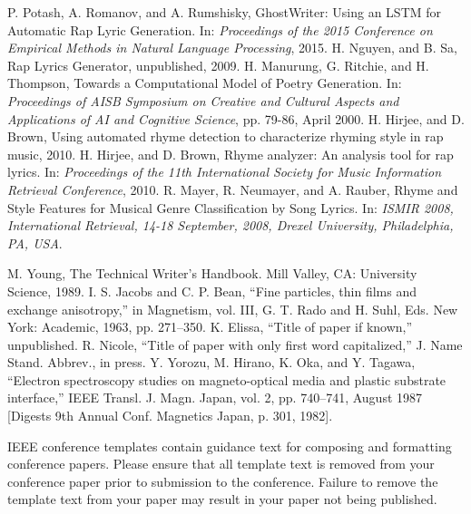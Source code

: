 \documentclass[conference]{IEEEtran}
\begin{document}
\begin{thebibliography}{00}
 P. Potash, A. Romanov, and A. Rumshisky, GhostWriter: Using an LSTM for Automatic Rap Lyric Generation. In: \emph{Proceedings of the 2015 Conference on Empirical Methods in Natural Language Processing}, 2015.
 H. Nguyen, and B. Sa, Rap Lyrics Generator, unpublished, 2009.
 H. Manurung, G. Ritchie, and H. Thompson, Towards a Computational Model of Poetry Generation. In: \emph{Proceedings of AISB Symposium on Creative and Cultural Aspects and Applications of AI and Cognitive Science}, pp. 79-86, April 2000.
 H. Hirjee, and D. Brown, Using automated rhyme detection to characterize rhyming style in rap music, 2010.
 H. Hirjee, and D. Brown, Rhyme analyzer: An analysis tool for rap lyrics. In: \emph{Proceedings of the 11th International Society for Music Information Retrieval Conference}, 2010.
 R. Mayer, R. Neumayer, and A. Rauber, Rhyme and Style Features for Musical Genre Classification by Song Lyrics. In: \emph{ISMIR 2008,  International Retrieval, 14-18 September, 2008, Drexel University, Philadelphia, PA, USA}.

 M. Young, The Technical Writer's Handbook. Mill Valley, CA: University Science, 1989.
 I. S. Jacobs and C. P. Bean, ``Fine particles, thin films and exchange anisotropy,'' in Magnetism, vol. III, G. T. Rado and H. Suhl, Eds. New York: Academic, 1963, pp. 271--350.
 K. Elissa, ``Title of paper if known,'' unpublished.
 R. Nicole, ``Title of paper with only first word capitalized,'' J. Name Stand. Abbrev., in press.
 Y. Yorozu, M. Hirano, K. Oka, and Y. Tagawa, ``Electron spectroscopy studies on magneto-optical media and plastic substrate interface,'' IEEE Transl. J. Magn. Japan, vol. 2, pp. 740--741, August 1987 [Digests 9th Annual Conf. Magnetics Japan, p. 301, 1982].

\end{thebibliography}
\vspace{12pt}
\color{red}
IEEE conference templates contain guidance text for composing and formatting conference papers. Please ensure that all template text is removed from your conference paper prior to submission to the conference. Failure to remove the template text from your paper may result in your paper not being published.
\end{document}
